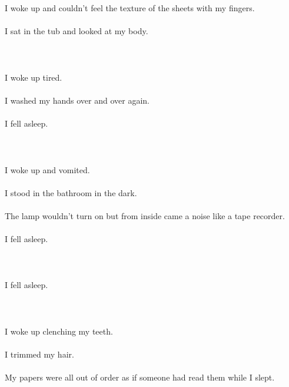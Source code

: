 \documentclass{article}
\begin{document}
    
    \section{}
    I woke up and couldn't feel the texture of the sheets with my fingers.\\\\I sat in the tub and looked at my body.\\\\ 
    \newpage
    
    \section{}
    I woke up tired.\\\\I washed my hands over and over again.\\\\I fell asleep.\\\\ 
    \newpage
    
    \section{}
    I woke up and vomited.\\\\I stood in the bathroom in the dark.\\\\The lamp wouldn't turn on but from inside came a noise like a tape recorder.\\\\I fell asleep.\\\\ 
    \newpage
    
    \section{}
    I fell asleep.\\\\ 
    \newpage
    
    \section{}
    I woke up clenching my teeth.\\\\I trimmed my hair.\\\\My papers were all out of order as if someone had read them while I slept.\\\\ 
    \newpage
    
\end{document}
